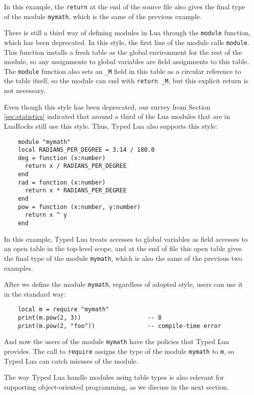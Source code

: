 In this example, the \texttt{return} at the end of the source file
also gives the final type of the module \texttt{mymath}, which is
the same of the previous example.

There is still a third way of defining modules in Lua through the
\texttt{module} function, which has been deprecated.
In this style, the first line of the module calls \texttt{module}.
This function installs a fresh table as the global environment for
the rest of the module, so any assignments to global variables are
field assignments to this table.
The \texttt{module} function also sets an \texttt{\string_M} field
in this table as a circular reference to the table itself,
so the module can end with \texttt{return \string_M},
but this explicit return is not necessary.

Even though this style has been deprecated, our survey from
Section \ref{sec:statistics} indicated that around a third of the
Lua modules that are in LuaRocks still use this style.
Thus, Typed Lua also supports this style:
\begin{verbatim}
    module "mymath"
    local RADIANS_PER_DEGREE = 3.14 / 180.0
    deg = function (x:number)
      return x / RADIANS_PER_DEGREE
    end
    rad = function (x:number)
      return x * RADIANS_PER_DEGREE
    end
    pow = function (x:number, y:number)
      return x ^ y
    end
\end{verbatim}

In this example, Typed Lua treats accesses to global variables as
field accesses to an open table in the top-level scope,
and at the end of file this open table gives the final type of the
module \texttt{mymath}, which is also the same of the previous two
examples.

After we define the module \texttt{mymath}, regardless of adopted style,
users can use it in the standard way:
\begin{verbatim}
    local m = require "mymath"
    print(m.pow(2, 3))                   -- 8
    print(m.pow(2, "foo"))               -- compile-time error
\end{verbatim}

And now the users of the module \texttt{mymath} have the policies that
Typed Lua provides.
The call to \texttt{require} assigns the type of the module \texttt{mymath}
to \texttt{m}, so Typed Lua can catch misuses of the module.

The way Typed Lua handle modules using table types is also
relevant for supporting object-oriented programming, as we discuss in
the next section.

